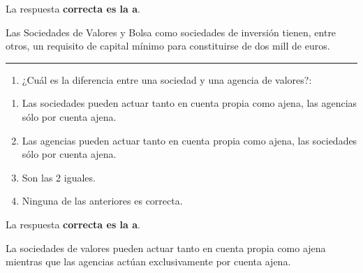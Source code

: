 \documentclass[
  letterpaper,
  DIV=11,
  numbers=noendperiod]{scrreprt}
\providecommand{\tightlist}{%
  \setlength{\itemsep}{0pt}\setlength{\parskip}{0pt}}\usepackage{longtable,booktabs,array}
\begin{document}
\begin{tcolorbox}[enhanced jigsaw, left=2mm, opacityback=0, colback=white, breakable, arc=.35mm, bottomrule=.15mm, rightrule=.15mm, toprule=.15mm, leftrule=.75mm, colframe=quarto-callout-tip-color-frame]
\begin{minipage}[t]{5.5mm}
\textcolor{quarto-callout-tip-color}{\faLightbulb}
\end{minipage}%
\begin{minipage}[t]{\textwidth - 5.5mm}

La respuesta \textbf{correcta es la a}.

Las Sociedades de Valores y Bolsa como sociedades de inversión tienen,
entre otros, un requisito de capital mínimo para constituirse de dos
mill de euros.

\end{minipage}%
\end{tcolorbox}

\begin{center}\rule{0.5\linewidth}{0.5pt}\end{center}

\begin{enumerate}
\def\labelenumi{\arabic{enumi}.}
\setcounter{enumi}{24}
\tightlist
\item
  ¿Cuál es la diferencia entre una sociedad y una agencia de valores?:
\end{enumerate}

\begin{enumerate}
\def\labelenumi{\alph{enumi})}
\item
  Las sociedades pueden actuar tanto en cuenta propia como ajena, las
  agencias sólo por cuenta ajena.
\item
  Las agencias pueden actuar tanto en cuenta propia como ajena, las
  sociedades sólo por cuenta ajena.
\item
  Son las 2 iguales.
\item
  Ninguna de las anteriores es correcta.
\end{enumerate}

\begin{tcolorbox}[enhanced jigsaw, left=2mm, opacityback=0, colback=white, breakable, arc=.35mm, bottomrule=.15mm, rightrule=.15mm, toprule=.15mm, leftrule=.75mm, colframe=quarto-callout-tip-color-frame]
\begin{minipage}[t]{5.5mm}
\textcolor{quarto-callout-tip-color}{\faLightbulb}
\end{minipage}%
\begin{minipage}[t]{\textwidth - 5.5mm}

La respuesta \textbf{correcta es la a}.

La sociedades de valores pueden actuar tanto en cuenta propia como ajena
mientras que las agencias actúan exclusivamente por cuenta ajena.

\end{minipage}%
\end{tcolorbox}
\end{document}
